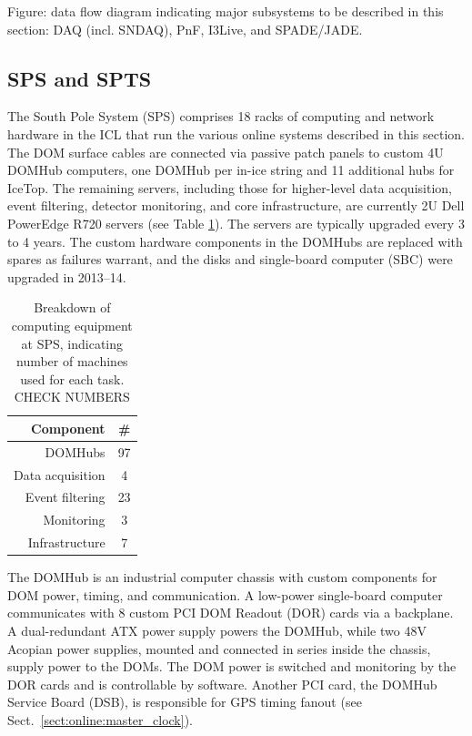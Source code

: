 Figure: data flow diagram indicating major subsystems to be described in
this section: DAQ (incl. SNDAQ), PnF, I3Live, and SPADE/JADE.

\subsection{\label{sect:sps}SPS and SPTS}

The South Pole System (SPS) comprises 18 racks of computing and
network hardware in the ICL that run the various online systems described in this
section.  The DOM surface cables are connected via passive patch panels to
custom 4U DOMHub computers, one DOMHub per in-ice string and 11 additional
hubs for IceTop.  The remaining servers, including those for higher-level
data acquisition, event filtering, detector monitoring, and core
infrastructure, are currently 2U Dell PowerEdge R720 servers (see Table
\ref{tab:sps_breakdown}).  The servers are typically upgraded every 3 to 4
years.  The custom hardware components in the DOMHubs are replaced with spares as
failures warrant, and the disks and single-board computer (SBC) were
upgraded in 2013--14.

\begin{table}[h]
  \centering
  \begin{tabular}{ r | c }
    \bf{Component} & \bf{\#} \\
    \hline
    DOMHubs & 97 \\
    Data acquisition & 4 \\   
    Event filtering & 23 \\
    Monitoring & 3 \\
    Infrastructure & 7 \\
  \end{tabular}
  \caption{Breakdown of computing equipment at SPS, indicating number of
    machines used for each task. CHECK NUMBERS} 
  \label{tab:sps_breakdown}
\end{table}

The DOMHub is an industrial computer chassis with custom components for
DOM power, timing, and communication.  A low-power single-board computer
communicates with 8 custom PCI DOM Readout (DOR) cards via a backplane.  A
dual-redundant ATX power supply powers the DOMHub, while two 48V Acopian
power supplies, mounted and connected in series inside the chassis, supply
power to the DOMs.  The DOM power is switched and monitoring by the DOR
cards and is controllable by software.  Another PCI card, the DOMHub
Service Board (DSB), is responsible for GPS timing fanout (see
Sect.~\ref{sect:online:master_clock}).

